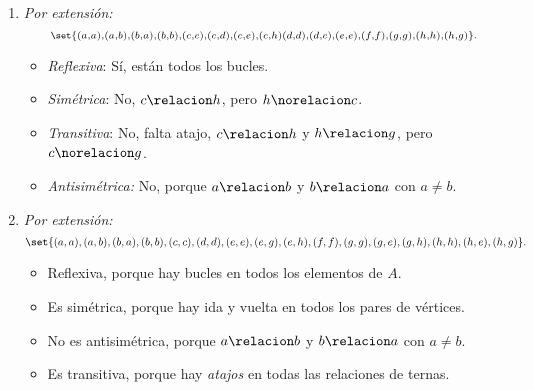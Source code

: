 \begin{enumerate}[label=\roman*)]
        \bigskip

  \item
        \begin{minipage}{0.3\textwidth}
          \diecinueveiii
        \end{minipage}
        \begin{minipage}{0.7\textwidth}
          \textit{Por extensión:}
          $$
            \scriptstyle
            \set{(a,a),(a,b),(b,a),(b,b),
              (c,c),(c,d),(c,e),(c,h)
              (d,d),(d,c), (e,e), (f,f), (g,g), (h,h),(h,g) }.
          $$
          \begin{itemize}
            \item \textit{Reflexiva}: Sí, están todos los bucles.
            \item \textit{Simétrica}: No, $c \relacion h$, pero $h \norelacion c$.
            \item \textit{Transitiva}: No, falta atajo, $c \relacion h$ y $h \relacion g$, pero $c \norelacion g$.
            \item \textit{Antisimétrica:} No, porque $a \relacion b$ y $b \relacion a$ con $a \neq b$.
          \end{itemize}
        \end{minipage}

        \bigskip

  \item
        \begin{minipage}{0.3\textwidth}
          \diecinueveiv
        \end{minipage}
        \begin{minipage}{0.7\textwidth}
          \textit{Por extensión:}
          {\tiny
            $$
              \set{(a,a),(a,b),(b,a),(b,b),(c,c),(d,d),
                (e,e),(e,g),(e,h),
                (f,f),
                (g,g),(g,e),(g,h),
                (h,h),(h,e),(h,g)
              }.
            $$
          }
          \begin{itemize}
            \item Reflexiva, porque hay bucles en todos los elementos de $A$.
            \item Es simétrica, porque hay ida y vuelta en todos los pares de vértices.
            \item No es antisimétrica, porque $a \relacion b$ y $b \relacion a$ con $a \neq b$.
            \item Es transitiva, porque hay \textit{atajos} en todas las relaciones de ternas.
          \end{itemize}
        \end{minipage}
\end{enumerate}

\begin{aportes}
  \item {}
  \item {}
\end{aportes}
